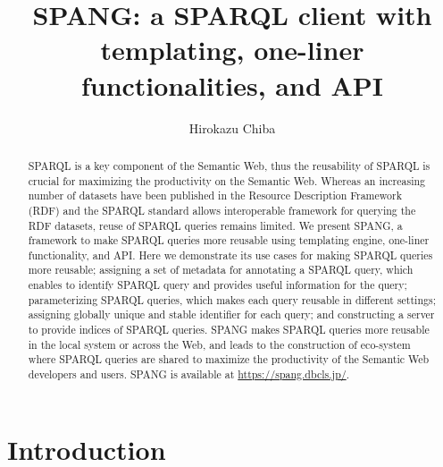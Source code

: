 \documentclass[runningheads]{llncs}
\begin{document}
\title{SPANG: a SPARQL client with templating, one-liner functionalities, and API}
\author{Hirokazu Chiba}
%
\maketitle              %
%
\begin{abstract}
SPARQL is a key component of the Semantic Web, thus the reusability of SPARQL is crucial for maximizing the productivity on the Semantic Web.
Whereas an increasing number of datasets have been published in the Resource Description Framework (RDF) and the SPARQL standard allows interoperable framework for querying the RDF datasets, reuse of SPARQL queries remains limited. We present SPANG, a framework to make SPARQL queries more reusable using templating engine, one-liner functionality, and API. Here we demonstrate its use cases for making SPARQL queries more reusable; assigning a set of metadata for annotating a SPARQL query, which enables to identify SPARQL query and provides useful information for the query; parameterizing SPARQL queries, which makes each query reusable in different settings; assigning globally unique and stable identifier for each query; and constructing a server to provide indices of SPARQL queries. SPANG makes SPARQL queries more reusable in the local system or across the Web, and leads to the construction of eco-system where SPARQL queries are shared to maximize the productivity of the Semantic Web developers and users. SPANG is available at \url{https://spang.dbcls.jp/}.


\end{abstract}


\section{Introduction}
\end{document}
